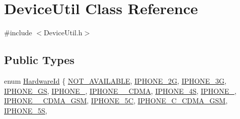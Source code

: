 \hypertarget{class_device_util}{}\section{Device\+Util Class Reference}
\label{class_device_util}


{\ttfamily \#include $<$Device\+Util.\+h$>$}

\subsection*{Public Types}
\begin{DoxyCompactItemize}
\item 
enum \mbox{\hyperlink{class_device_util_a45e0ab9d49e3a0583798709c4613d9b6}{Hardware\+Id}} \{ \newline
\mbox{\hyperlink{class_device_util_a45e0ab9d49e3a0583798709c4613d9b6a59dfa2248607f7e6a83d18fae8306b5f}{N\+O\+T\+\_\+\+A\+V\+A\+I\+L\+A\+B\+LE}}, 
\mbox{\hyperlink{class_device_util_a45e0ab9d49e3a0583798709c4613d9b6a426756b6e91e32d8787381edb82e2f99}{I\+P\+H\+O\+N\+E\+\_\+2G}}, 
\mbox{\hyperlink{class_device_util_a45e0ab9d49e3a0583798709c4613d9b6aef9f2cde0d6264b94a3b0b4a8401a857}{I\+P\+H\+O\+N\+E\+\_\+3G}}, 
\mbox{\hyperlink{class_device_util_a45e0ab9d49e3a0583798709c4613d9b6ad5d2d991e046187f0c8125524af89dcc}{I\+P\+H\+O\+N\+E\+\_\+GS}}, 
\newline
\mbox{\hyperlink{class_device_util_a45e0ab9d49e3a0583798709c4613d9b6a6bc46fcd2e969285170bb3820edfbb53}{I\+P\+H\+O\+N\+E\+\_}}, 
\mbox{\hyperlink{class_device_util_a45e0ab9d49e3a0583798709c4613d9b6a0bda6882d66a01056b8b27407cf04dde}{I\+P\+H\+O\+N\+E\+\_\+\_\+\+C\+D\+MA}}, 
\mbox{\hyperlink{class_device_util_a45e0ab9d49e3a0583798709c4613d9b6aaa6bc9531710ba79ea16e0a5282aad2d}{I\+P\+H\+O\+N\+E\+\_\+4S}}, 
\mbox{\hyperlink{class_device_util_a45e0ab9d49e3a0583798709c4613d9b6a3a685b702a361e4b8f7644a0db02edec}{I\+P\+H\+O\+N\+E\+\_}}, 
\newline
\mbox{\hyperlink{class_device_util_a45e0ab9d49e3a0583798709c4613d9b6a5a458f705f8a7c11a8c40e276b8f3435}{I\+P\+H\+O\+N\+E\+\_\+\_\+\+C\+D\+M\+A\+\_\+\+G\+SM}}, 
\mbox{\hyperlink{class_device_util_a45e0ab9d49e3a0583798709c4613d9b6a8c61baf0087c75d5e1065706c6882891}{I\+P\+H\+O\+N\+E\+\_\+5C}}, 
\mbox{\hyperlink{class_device_util_a45e0ab9d49e3a0583798709c4613d9b6af34c861978cbdc2dfb7a817618a05c75}{I\+P\+H\+O\+N\+E\+\_\+C\+\_\+\+C\+D\+M\+A\+\_\+\+G\+SM}}, 
\mbox{\hyperlink{class_device_util_a45e0ab9d49e3a0583798709c4613d9b6a29ea42b1c0889a0dfd11ee44a4ebc196}{I\+P\+H\+O\+N\+E\+\_\+5S}}, 

\end{DoxyCompactItemize}

